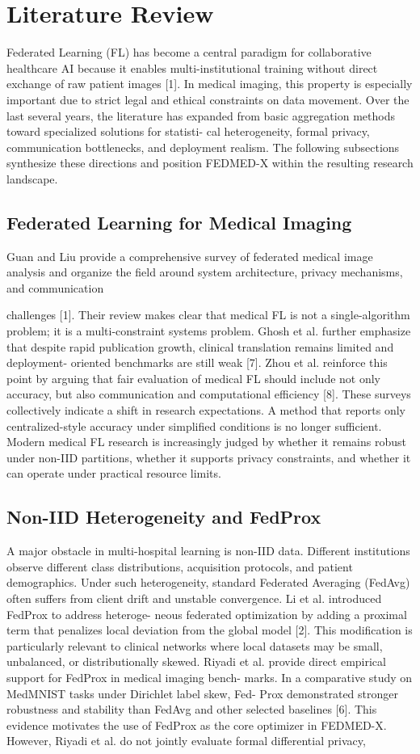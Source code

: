\documentclass[12pt,a4paper]{report}
\begin{document}
\section{Literature Review}
Federated Learning (FL) has become a central paradigm for collaborative healthcare AI because it enables multi-institutional training without direct exchange of raw patient images [1]. In medical imaging, this property is especially important due to strict legal and ethical constraints on data movement. Over the last several years, the literature has expanded from basic aggregation methods toward specialized solutions for statisti- cal heterogeneity, formal privacy, communication bottlenecks, and deployment realism.
The following subsections synthesize these directions and position FEDMED-X within the resulting research landscape.
\newpage
\subsection{Federated Learning for Medical Imaging}
Guan and Liu provide a comprehensive survey of federated medical image analysis and organize the field around system architecture, privacy mechanisms, and communication

challenges [1].
Their review makes clear that medical FL is not a single-algorithm problem; it is a multi-constraint systems problem. Ghosh et al. further emphasize that despite rapid publication growth, clinical translation remains limited and deployment- oriented benchmarks are still weak [7]. Zhou et al. reinforce this point by arguing that fair evaluation of medical FL should include not only accuracy, but also communication and computational efficiency [8].
These surveys collectively indicate a shift in research expectations. A method that reports only centralized-style accuracy under simplified conditions is no longer sufficient.
Modern medical FL research is increasingly judged by whether it remains robust under non-IID partitions, whether it supports privacy constraints, and whether it can operate under practical resource limits.
\subsection{Non-IID Heterogeneity and FedProx}
A major obstacle in multi-hospital learning is non-IID data.
Different institutions observe different class distributions, acquisition protocols, and patient demographics.
Under such heterogeneity, standard Federated Averaging (FedAvg) often suffers from client drift and unstable convergence. Li et al. introduced FedProx to address heteroge- neous federated optimization by adding a proximal term that penalizes local deviation from the global model [2]. This modification is particularly relevant to clinical networks where local datasets may be small, unbalanced, or distributionally skewed.
Riyadi et al. provide direct empirical support for FedProx in medical imaging bench- marks. In a comparative study on MedMNIST tasks under Dirichlet label skew, Fed-
Prox demonstrated stronger robustness and stability than FedAvg and other selected baselines [6].
This evidence motivates the use of FedProx as the core optimizer in
FEDMED-X. However, Riyadi et al. do not jointly evaluate formal differential privacy,
\end{document}
